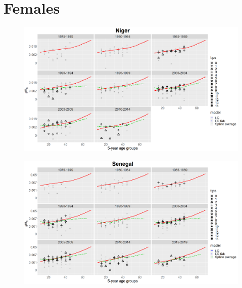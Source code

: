 \documentclass[12pt,a4paper]{article}
\begin{document}
\section*{\centering Females}
\begin{figure}[H]
\includegraphics[width = \linewidth]{Burkina Faso/8/niger females.png}
\end{figure}
\begin{figure}[H]
\includegraphics[width = \linewidth]{Burkina Faso/8/senegal females.png}
\end{figure}

\newpage
\end{document}
